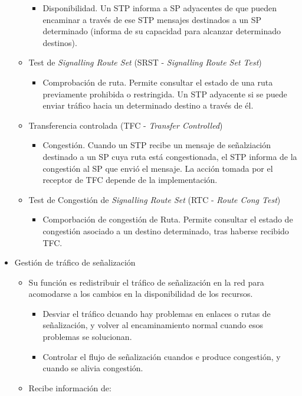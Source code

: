\documentclass[10pt,portrait, twocolumn]{article}
\begin{document}
\begin{itemize}
\begin{itemize}
\begin{itemize}
			\item Disponibilidad. Un STP informa a SP adyacentes de que pueden encaminar a través de ese STP mensajes destinados a un SP determinado (informa de su capacidad para alcanzar determinado destinos).
			\end{itemize}
		\item Test de \textit{Signalling Route Set} (SRST - \textit{Signalling Route Set Test})
			\begin{itemize}
			\item Comprobación de ruta. Permite consultar el estado de una ruta previamente prohibida o restringida. Un STP adyacente si se puede enviar tráfico hacia un determinado destino a través de él.
			\end{itemize}
		\item Transferencia controlada (TFC - \textit{Transfer Controlled})
			\begin{itemize}
			\item Congestión. Cuando un STP recibe un mensaje de señalziación destinado a un SP cuya ruta está congestionada, el STP informa de la congestión al SP que envió el mensaje. La acción tomada por el receptor de TFC depende de la implementación.
			\end{itemize}
		\item Test de Congestión de \textit{Signalling Route Set} (RTC - \textit{Route Cong Test})
			\begin{itemize}
			\item Comporbación de congestión de Ruta. Permite consultar el estado de congestión asociado a un destino determinado, tras haberse recibido TFC.
			\end{itemize} 
		\end{itemize}
	\item Gestión de tráfico de señalización
		\begin{itemize}
		\item Su función es redistribuir el tráfico de señalización en la red para acomodarse a los cambios en la disponibilidad de los recursos.
			\begin{itemize}
			\item Desviar el tráfico dcuando hay problemas en enlaces o rutas de señalización, y volver al encaminamiento normal cuando esos problemas se solucionan.
			\item Controlar el flujo de señalización cuandos e produce congestión, y cuando se alivia congestión.
			\end{itemize}
		\item Recibe información de:

\end{itemize}
\end{itemize}
\end{document}
